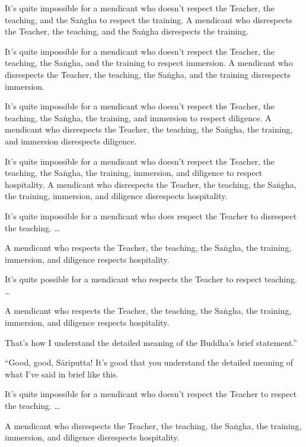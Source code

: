 \documentclass[12pt,openany]{book}%
\begin{document}
It’s quite impossible for a mendicant who doesn’t respect the Teacher, the teaching, and the \textsanskrit{Saṅgha} to respect the training. A mendicant who disrespects the Teacher, the teaching, and the \textsanskrit{Saṅgha} disrespects the training. 

It’s quite impossible for a mendicant who doesn’t respect the Teacher, the teaching, the \textsanskrit{Saṅgha}, and the training to respect immersion. A mendicant who disrespects the Teacher, the teaching, the \textsanskrit{Saṅgha}, and the training disrespects immersion. 

It’s quite impossible for a mendicant who doesn’t respect the Teacher, the teaching, the \textsanskrit{Saṅgha}, the training, and immersion to respect diligence. A mendicant who disrespects the Teacher, the teaching, the \textsanskrit{Saṅgha}, the training, and immersion disrespects diligence. 

It’s quite impossible for a mendicant who doesn’t respect the Teacher, the teaching, the \textsanskrit{Saṅgha}, the training, immersion, and diligence to respect hospitality. A mendicant who disrespects the Teacher, the teaching, the \textsanskrit{Saṅgha}, the training, immersion, and diligence disrespects hospitality. 

It’s quite impossible for a mendicant who does respect the Teacher to disrespect the teaching. … 

A mendicant who respects the Teacher, the teaching, the \textsanskrit{Saṅgha}, the training, immersion, and diligence respects hospitality. 

It’s quite possible for a mendicant who respects the Teacher to respect teaching. … 

A mendicant who respects the Teacher, the teaching, the \textsanskrit{Saṅgha}, the training, immersion, and diligence respects hospitality. 

That’s how I understand the detailed meaning of the Buddha’s brief statement.” 

“Good, good, \textsanskrit{Sāriputta}! It’s good that you understand the detailed meaning of what I’ve said in brief like this. 

It’s quite impossible for a mendicant who doesn’t respect the Teacher to respect the teaching. … 

A mendicant who disrespects the Teacher, the teaching, the \textsanskrit{Saṅgha}, the training, immersion, and diligence disrespects hospitality. 
\end{document}
